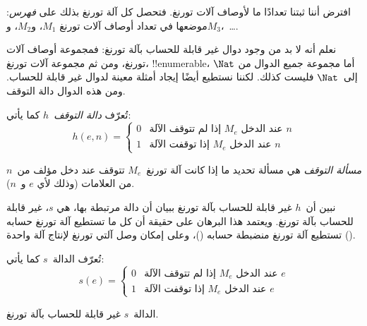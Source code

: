 \documentclass[../../../include/open-logic-section]{subfiles}
\begin{document}

\begin{explain}
افترض أننا ثبتنا تعدادًا ما لأوصاف آلات تورنغ. فتحصل كل آلة تورنغ
بذلك على \emph{فهرس}: موضعها في تعداد أوصاف آلات تورنغ $M_1$، و$M_2$،
و$M_3$،~\dots.

نعلم أنه لا بد من وجود دوال غير قابلة للحساب بآلة تورنغ: فمجموعة
أوصاف آلات تورنغ، ومن ثم مجموعة آلات تورنغ، !!{enumerable}، أما مجموعة
جميع الدوال من $\Nat$ إلى~$\Nat$ فليست كذلك. لكننا نستطيع أيضًا إيجاد
أمثلة معينة لدوال غير قابلة للحساب. ومن هذه الدوال دالة التوقف.
\end{explain}

\begin{defn}
 تُعرّف \emph{دالة التوقف}~$h$ كما يأتي:
\[
h(e,n) =
\begin{cases}
  \text{0} & \text{إذا لم تتوقف الآلة~$M_e$ عند الدخل $n$} \\
  \text{1} & \text{إذا توقفت الآلة~$M_e$ عند الدخل $n$}
\end{cases}
\]
\end{defn}

\begin{defn}
\emph{مسألة التوقف} هي مسألة تحديد ما إذا كانت آلة تورنغ~$M_e$ تتوقف
عند دخل مؤلف من~$n$ من العلامات (وذلك لأي $e$ و~$n$).
\end{defn}

\begin{explain}
نبين أن~$h$ غير قابلة للحساب بآلة تورنغ ببيان أن دالة مرتبطة بها، هي
$s$، غير قابلة للحساب بآلة تورنغ. ويعتمد هذا البرهان على حقيقة أن كل
ما تستطيع آلة تورنغ حسابه تستطيع آلة تورنغ منضبطة حسابه
()، وعلى إمكان وصل آلتي تورنغ لإنتاج آلة واحدة
().
\end{explain}

\begin{defn} تُعرّف الدالة~$s$ كما يأتي:
\[
s(e) =
\begin{cases}
  \text{0} & \text{إذا لم تتوقف الآلة~$M_e$ عند الدخل $e$} \\
  \text{1} & \text{إذا توقفت الآلة~$M_e$ عند الدخل $e$}
\end{cases}
\]
\end{defn}

\begin{lem}
الدالة~$s$ غير قابلة للحساب بآلة تورنغ.
\end{lem}
\end{document}
